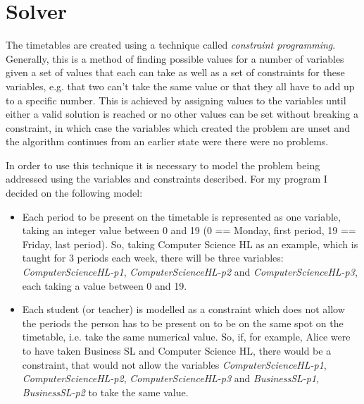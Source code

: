\documentclass[12pt]{article}
\begin{document}
    
\section{Solver}
    The timetables are created using a technique called \emph{constraint programming}.
    Generally, this is a method of finding possible values for a number of variables given a
    set of values that each can take as well as a set of constraints for these variables,
    e.g. that two can't take the same value or that they all have to add up to a specific
    number.  This is achieved by assigning values to the variables until either a valid
    solution is reached or no other values can be set without breaking a constraint, in
    which case the variables which created the problem are unset and the algorithm continues
    from an earlier state were there were no problems.

    In order to use this technique it is necessary to model the problem being addressed
    using the variables and constraints described. For my program I decided on the following
    model:
    \begin{itemize}
        \item Each period to be present on the timetable is represented as one variable,
            taking an integer value between 0 and 19 (0 == Monday, first period, 19 ==
            Friday, last period). So, taking Computer Science HL as an example, which is
            taught for 3 periods each week, there will be three variables:
            \textit{ComputerScienceHL-p1}, \textit{ComputerScienceHL-p2} and
            \textit{ComputerScienceHL-p3}, each taking a value between 0 and 19.

        \item Each student (or teacher) is modelled as a constraint which does not allow the
            periods the person has to be present on to be on the same spot on the timetable,
            i.e. take the same numerical value. So, if, for example, Alice were to have
            taken Business SL and Computer Science HL, there would be a constraint, that
            would not allow the variables \textit{ComputerScienceHL-p1},
            \textit{ComputerScienceHL-p2},  \textit{ComputerScienceHL-p3} and
            \textit{BusinessSL-p1}, \textit{BusinessSL-p2} to take the same value.
    \end{itemize}

    \inputminted[fontsize=\footnotesize]{python}{solver_listing.py}
    
\printbibliography[type=software,title={Libraries}]
\end{document}
